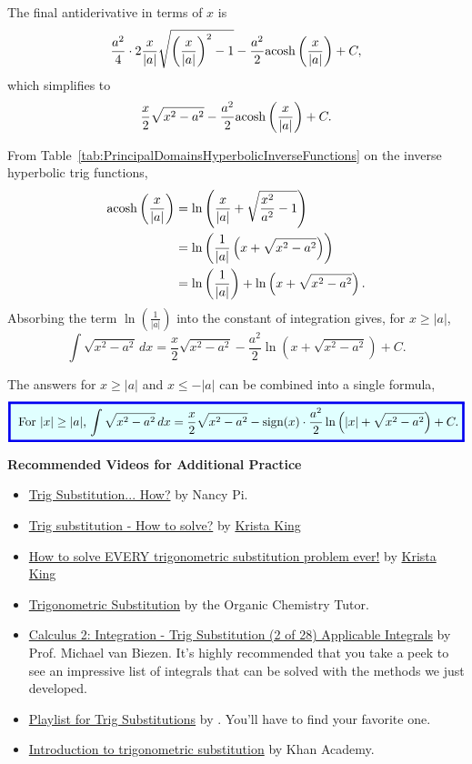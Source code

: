 The final antiderivative in terms of \( x \) is
\[
\frac{a^2}{4} \cdot 2\frac{x}{|a|}\sqrt{\left(\frac{x}{|a|}\right)^2 - 1} - \frac{a^2}{2}\mathrm{acosh}\left(\frac{x}{|a|}\right) + C,
\]
which simplifies to
\[
\frac{x}{2}\sqrt{x^2 - a^2} - \frac{a^2}{2}\mathrm{acosh}\left(\frac{x}{|a|}\right) + C.
\]


From Table~\ref{tab:PrincipalDomainsHyperbolicInverseFunctions} on the inverse hyperbolic trig functions, 
\begin{align*}
    \mathrm{acosh}\left( \frac{x}{|a|}\right) &= \ln\left( \frac{x}{|a|}  + \sqrt{\frac{x^2}{a^2} -1}\right) \\
    &= \ln\left( \frac{1}{|a|} \left( x + \sqrt{x^2 - a^2} \right) \right) \\
    &= \ln \left( \frac{1}{|a|} \right) +  \ln\left( x + \sqrt{x^2 - a^2} \right).
\end{align*}
Absorbing the term $ \ln \left( \frac{1}{|a|} \right)$ into the constant of integration gives, for $x\ge |a|$,
$$ \int \sqrt{x^2 - a^2}\, dx = \frac{x}{2}\sqrt{x^2 - a^2} - \frac{a^2}{2} \ln\left( x + \sqrt{x^2 - a^2} \right) + C.$$

The answers for $x \ge |a|$ and $x \le -|a|$ can be combined into a single formula,
\[
\setlength{\fboxrule}{2pt} %
\fcolorbox{brightblue}{lightblue}{%
\addtolength{\fboxsep}{5pt} %
For $|x|\ge |a|$, $\displaystyle
\int \sqrt{x^2 - a^2}\, dx = \frac{x}{2}\sqrt{x^2 - a^2} - \operatorname{sign}(x) \cdot \frac{a^2}{2} \ln\left( |x| + \sqrt{x^2 - a^2} \right) + C.
$%
}
\]


\Qed



\bigskip

\textbf{Recommended Videos for Additional Practice}
\begin{itemize}
    \item \href{https://youtu.be/cyi-qyG1Yds}{Trig Substitution... How?} by Nancy Pi.
    \item \href{https://youtu.be/7mKT_ygB9Xg}{Trig substitution - How to solve?} by \href{https://www.kristakingmath.com/about-krista}{Krista King}
    \item \href{https://www.youtube.com/watch?v=Al6p3L2l9zY}{How to solve EVERY trigonometric substitution problem ever!} by \href{https://www.kristakingmath.com/about-krista}{Krista King}
    \item \href{https://youtu.be/ocgjfF2AboA}{Trigonometric Substitution} by the Organic Chemistry Tutor.  
    \item \href{https://www.youtube.com/watch?v=XmpoQtV8HHY}{Calculus 2: Integration - Trig Substitution (2 of 28) Applicable Integrals} by Prof. Michael van Biezen. It's highly recommended that you take a peek to see an impressive list of integrals that can be solved with the methods we just developed. 
    \item \href{https://www.youtube.com/results?search_query=bprp+trig+substitutions}{Playlist for Trig Substitutions} by \bprp. You'll have to find your favorite one.
    \item \href{https://youtu.be/EV5dhv0A2wU}{Introduction to trigonometric substitution} by Khan Academy.
\end{itemize}


